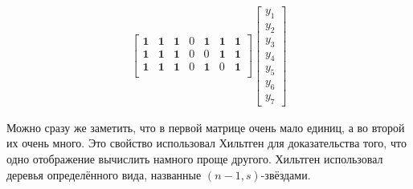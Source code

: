\documentclass[a4paper, 14pt]{extarticle}
\begin{document}
\[\begin{aligned}
\begin{bmatrix}
\mathbf 1 & \mathbf 1 & \mathbf 1 & 0 & \mathbf 1 & \mathbf 1 & \mathbf 1 \\
\mathbf 1 & \mathbf 1 & \mathbf 1 & 0 & 0 & \mathbf 1 & \mathbf 1 \\
\mathbf 1 & \mathbf 1 & \mathbf 1 & 0 & \mathbf 1 & 0 & \mathbf 1 \\
\end{bmatrix} \begin{bmatrix}
y_1 \\ y_2 \\ y_3 \\ y_4 \\ y_5 \\ y_6 \\ y_7
\end{bmatrix}
\end{aligned}
\]

Можно сразу же заметить, что в первой матрице очень мало единиц, а во второй их
очень много. Это свойство использовал Хильтген для доказательства того, что одно
отображение вычислить намного проще другого. Хильтген использовал деревья
определённого вида, названные $(n - 1, s)$-звёздами.
\end{document}

